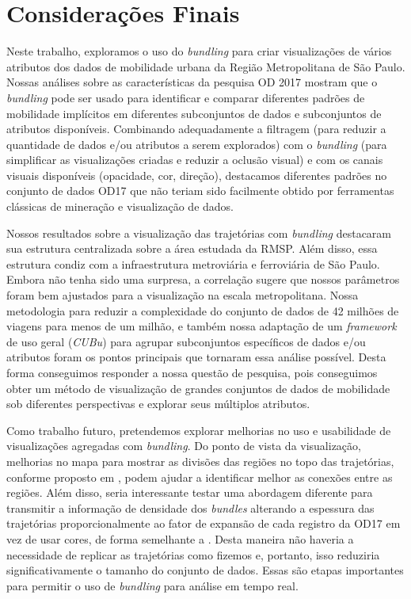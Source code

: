 \chapter{Considerações Finais}
\label{cap:plano-de-trabalho}

Neste trabalho, exploramos o uso do \emph{bundling} para criar
visualizações de vários atributos dos dados de mobilidade urbana da Região
Metropolitana de São Paulo. Nossas análises sobre as características da pesquisa
OD 2017 mostram que o \emph{bundling} pode ser usado para identificar e comparar
diferentes padrões de mobilidade implícitos em diferentes subconjuntos de dados
e subconjuntos de atributos disponíveis. Combinando adequadamente a filtragem
(para reduzir a quantidade de dados e/ou atributos a serem explorados) com o
\emph{bundling} (para simplificar as visualizações criadas e reduzir a oclusão
visual) e com os canais visuais disponíveis (opacidade, cor, direção),
destacamos diferentes padrões no conjunto de dados OD17 que não teriam sido
facilmente obtido por ferramentas clássicas de mineração e visualização de
dados.

Nossos resultados sobre a visualização das trajetórias com \emph{bundling}
destacaram sua estrutura centralizada sobre a área estudada da RMSP. Além disso,
essa estrutura condiz com a infraestrutura metroviária e ferroviária de São
Paulo. Embora não tenha sido uma surpresa, a correlação sugere que nossos
parâmetros foram bem ajustados para a visualização na escala metropolitana.
Nossa metodologia para reduzir a complexidade do conjunto de dados de 42 milhões
de viagens para menos de um milhão, e também nossa adaptação de um
\emph{framework} de uso geral (\emph{CUBu}) para agrupar subconjuntos específicos de
dados e/ou atributos foram os pontos principais que tornaram essa análise
possível. Desta forma conseguimos responder a nossa questão de pesquisa, pois
conseguimos obter um método de visualização de grandes conjuntos de dados de
mobilidade sob diferentes perspectivas e explorar seus múltiplos atributos.

Como trabalho futuro, pretendemos explorar melhorias no uso e usabilidade de
visualizações agregadas com \emph{bundling}. Do ponto de vista da visualização,
melhorias no mapa para mostrar as divisões das regiões no topo das trajetórias,
conforme proposto em \citet{Klein2014}, podem ajudar a identificar melhor as
conexões entre as regiões. Além disso, seria interessante testar uma abordagem
diferente para transmitir a informação de densidade dos \emph{bundles} alterando
a espessura das trajetórias proporcionalmente ao fator de expansão de cada
registro da OD17 em vez de usar cores, de forma semelhante a
\citet{lhuillier-fft:17}. Desta maneira não haveria a necessidade de replicar as
trajetórias como fizemos e, portanto, isso reduziria significativamente o
tamanho do conjunto de dados. Essas são etapas importantes para permitir o uso
de \emph{bundling} para análise em tempo real.

